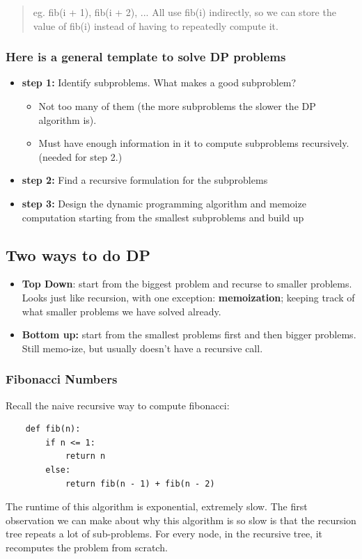 \documentclass[12pt]{article}
\begin{document}
\begin{quotation}
    eg. fib(i + 1), fib(i + 2), ... All use fib(i) indirectly, so we can store the value of fib(i) instead of having to repeatedly compute it.
\end{quotation}

\subsubsection{Here is a general template to solve DP problems}
\begin{itemize}
    \item \textbf{step 1:} Identify subproblems. What makes a good subproblem?
          \begin{itemize}
              \item Not too many of them (the more subproblems the slower the DP algorithm is).
              \item Must have enough information in it to compute subproblems recursively. (needed for step 2.)
          \end{itemize}
    \item \textbf{step 2:} Find a recursive formulation for the subproblems
    \item \textbf{step 3:} Design the dynamic programming algorithm and memoize computation starting from the smallest subproblems and build up
\end{itemize}

\subsection{Two ways to do DP}
\begin{itemize}
    \item \textbf{Top Down}: start from the biggest problem and recurse to smaller problems. Looks just like recursion, with one exception: \textbf{memoization}; keeping track of what smaller problems we have solved already.
    \item \textbf{Bottom up:} start from the smallest problems first and then bigger problems. Still memo-ize, but usually doesn't have a recursive call.
\end{itemize}

\subsubsection{Fibonacci Numbers}
Recall the naive recursive way to compute fibonacci:
\begin{lstlisting}
    def fib(n):
        if n <= 1:
            return n
        else:
            return fib(n - 1) + fib(n - 2)
\end{lstlisting}
The runtime of this algorithm is exponential, extremely slow. The first observation we can make about why this algorithm is so slow is that the recursion tree repeats a lot of sub-problems. For every node, in the recursive tree, it recomputes the problem from scratch.
\end{document}
